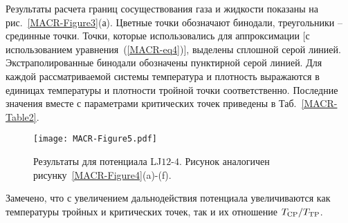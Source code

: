 Результаты расчета границ сосуществования газа и жидкости показаны на рис.~\ref{MACR-Figure3}(а).
Цветные точки обозначают бинодали, треугольники -- срединные точки.
Точки, которые использовались для аппроксимации [с использованием уравнения~(\ref{MACR-eq4})], выделены сплошной серой линией.
Экстраполированные бинодали обозначены пунктирной серой линией.
Для каждой рассматриваемой системы температура и плотность выражаются в единицах температуры и плотности тройной точки соответственно.
Последние значения вместе с параметрами критических точек приведены в Таб.~\ref{MACR-Table2}.

\begin{table}[h!]
    \caption{Значения плотностей и температур критических и тройных точек и параметры аппроксимации по уравнению~\eqref{MACR-eq4} для рассматриваемых моделей.
    Для обобщенных систем LJ температуры и плотности даны в сокращенных единицах.
    Для этана температура выражена в К, а плотность выражена в $\text{кг}/\text{м}^3$.
    Параметры критической и тройной точек для этана взяты из работы~\cite{10.1063/1.555785}.}
    \label{MACR-Table2}
\end{table}

\begin{figure}[!t]
\centering
    \texttt{[image: MACR-Figure5.pdf]}
    \caption{Результаты для потенциала LJ$12$-$4$.
    Рисунок аналогичен рисунку~\ref{MACR-Figure4}(a)-(f).}
\label{MACR-Figure5}
\end{figure}


Замечено, что с увеличением дальнодействия потенциала увеличиваются как температуры тройных и критических точек, так и их отношение $T_{\rm CP}/T_{\rm TP}$.

